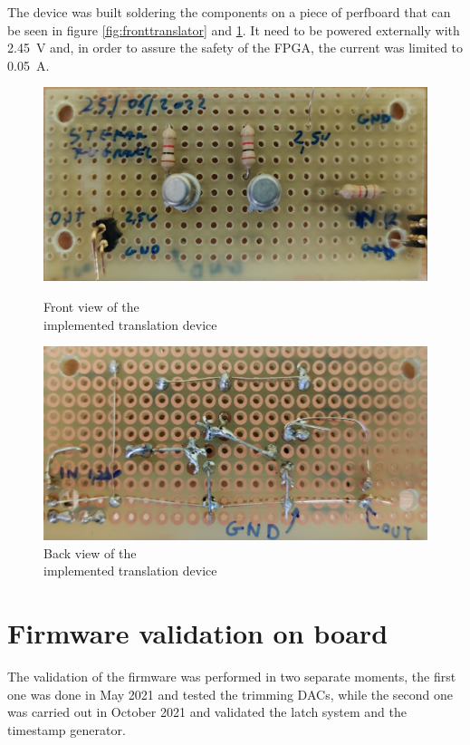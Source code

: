 \noindent The device was built soldering the components on a piece of perfboard that can be seen in figure \ref{fig:fronttranslator} and \ref{fig:backtranslator}.
It need to be powered externally with 2.45~V and, in order to assure the safety of the FPGA, the current was limited to 0.05~A. 
\begin{figure}[H]
	\centering
	\begin{minipage}{.5\textwidth}
		\centering
		\includegraphics[width=.99\linewidth]{IMG/ch5/FRONTTRANSLATOR}
		\caption{Front view of the \\implemented translation device}
		\label{fig:fronttranslator}
	\end{minipage}%
	\begin{minipage}{.5\textwidth}
		\centering
		\includegraphics[width=.99\linewidth]{IMG/ch5/BACKTRANSLATOR}
		\caption{Back view of the \\implemented translation device}
		\label{fig:backtranslator}
	\end{minipage}
\end{figure}

\section{Firmware validation on board}
The validation of the firmware was performed in two separate moments, the first one was done in May 2021 and tested the trimming DACs, while the second one was carried out in October 2021 and validated the latch system and the timestamp generator. 
